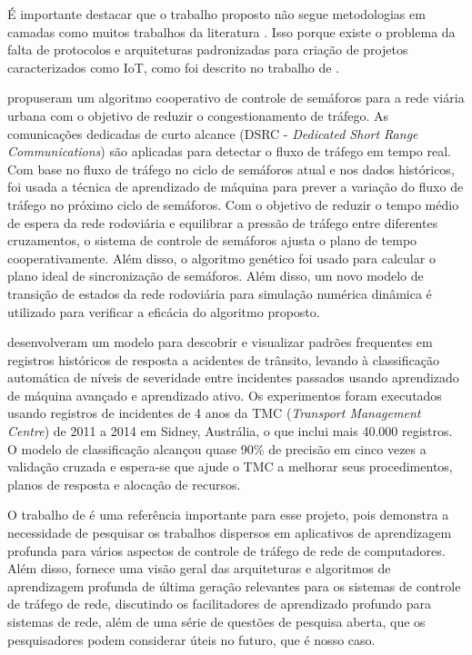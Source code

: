 \documentclass[12pt]{uftpibic}
\begin{document}
É importante destacar que o trabalho proposto não segue metodologias em camadas como muitos trabalhos da literatura \cite{Moore, Chen}. Isso porque existe o problema da falta de protocolos e arquiteturas padronizadas para criação de projetos caracterizados como IoT, como foi descrito no trabalho de .

 propuseram um algoritmo cooperativo de controle de semáforos para a rede viária urbana com o objetivo de reduzir o congestionamento de tráfego. As comunicações dedicadas de curto alcance (DSRC - {\it Dedicated Short Range Communications}) são aplicadas para detectar o fluxo de tráfego em tempo real. Com base no fluxo de tráfego no ciclo de semáforos atual e nos dados históricos, foi usada a técnica de aprendizado de máquina para prever a variação do fluxo de tráfego no próximo ciclo de semáforos. Com o objetivo de reduzir o tempo médio de espera da rede rodoviária e equilibrar a pressão de tráfego entre diferentes cruzamentos, o sistema de controle de semáforos ajusta o plano de tempo cooperativamente. Além disso, o algoritmo genético foi usado para calcular o plano ideal de sincronização de semáforos. Além disso, um novo modelo de transição de estados da rede rodoviária para simulação numérica dinâmica é utilizado para verificar a eficácia do algoritmo proposto.

 desenvolveram um modelo para descobrir e visualizar padrões frequentes em registros históricos de resposta a acidentes de trânsito, levando à classificação automática de níveis de severidade entre incidentes passados usando aprendizado de máquina avançado e aprendizado ativo. Os experimentos foram executados usando registros de incidentes de 4 anos da TMC ({\it Transport Management Centre}) de 2011 a 2014 em Sidney, Austrália, o que inclui mais 40.000 registros. O modelo de classificação alcançou quase 90\% de precisão em cinco vezes a validação cruzada e espera-se que ajude o TMC a melhorar seus procedimentos, planos de resposta e alocação de recursos.

O trabalho de  é uma referência importante para esse projeto, pois demonstra a necessidade de pesquisar os trabalhos dispersos em aplicativos de aprendizagem profunda para vários aspectos de controle de tráfego de rede de computadores. Além disso, fornece uma visão geral das arquiteturas e algoritmos de aprendizagem profunda de última geração relevantes para os sistemas de controle de tráfego de rede, discutindo os facilitadores de aprendizado profundo para sistemas de rede, além de uma série de questões de pesquisa aberta, que os pesquisadores podem considerar úteis no futuro, que é nosso caso.
\end{document}
